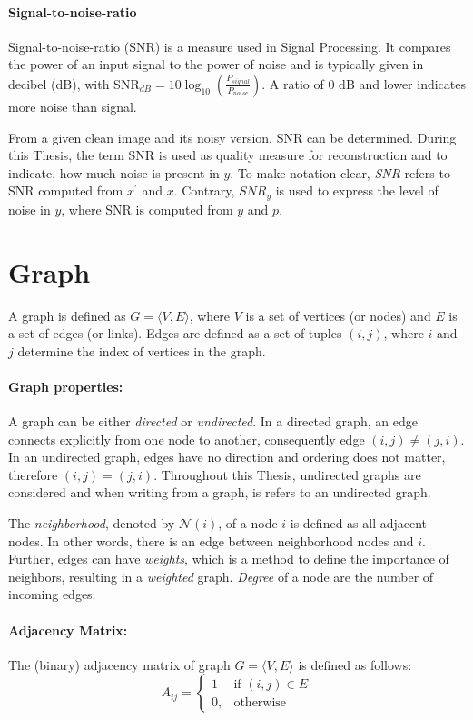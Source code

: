 \paragraph{Signal-to-noise-ratio}
Signal-to-noise-ratio (SNR) is a measure used in Signal Processing. 
It compares the power of an input signal to the power of noise and is typically given in decibel (dB), with
$\text{SNR}_{dB} = 10 \log_{10} \left(  \frac{P_{signal}}{P_{noise}} \right)$.
A ratio of 0 dB and lower indicates more noise than signal.

From a given clean image and its noisy version, SNR can be determined.
During this Thesis, the term SNR is used as quality measure for reconstruction and to indicate, how much noise is present in $y$.
To make notation clear, \textit{SNR} refers to SNR computed from $x^{\prime}$ and $x$.
Contrary, $\textit{SNR}_y$ is used to express the level of noise in $y$, 
where SNR is computed from $y$ and $p$.

\section{Graph}
A graph is defined as $G = \langle V,E \rangle$, where $V$ is a set of 
vertices (or nodes) and $E$ is a set of edges (or links). 
Edges are defined as a set of tuples $(i, j)$, where $i$ and $j$ determine 
the index of vertices in the graph.

\paragraph{Graph properties:}
A graph can be either \textit{directed} or \textit{undirected}. 
In a directed graph, an edge connects explicitly from one node to another, consequently edge $(i, j) \neq (j, i)$. 
In an undirected graph, edges have no direction and ordering does not matter, therefore $(i, j) = (j, i)$.
Throughout this Thesis, undirected graphs are considered and when writing from a graph, is refers to an undirected graph.

The \textit{neighborhood}, denoted by $\mathcal{N}(i)$, of a node $i$  is defined as all adjacent nodes.
In other words, there is an edge between neighborhood nodes and $i$. 
Further, edges can have \textit{weights}, which is a method to define the importance of neighbors, resulting in a \textit{weighted} graph.
\textit{Degree} of a node are the number of incoming edges.

\paragraph{Adjacency Matrix:}
The (binary) adjacency matrix of graph $G = \langle V, E \rangle$ is defined as follows:
\begin{equation}
    \label{eg:AdjacencyMatrix}
    A_{ij} =    
    \begin{cases}
        1  & \text{if } (i, j) \in E \\
        0, & \text{otherwise}
    \end{cases}
\end{equation}

